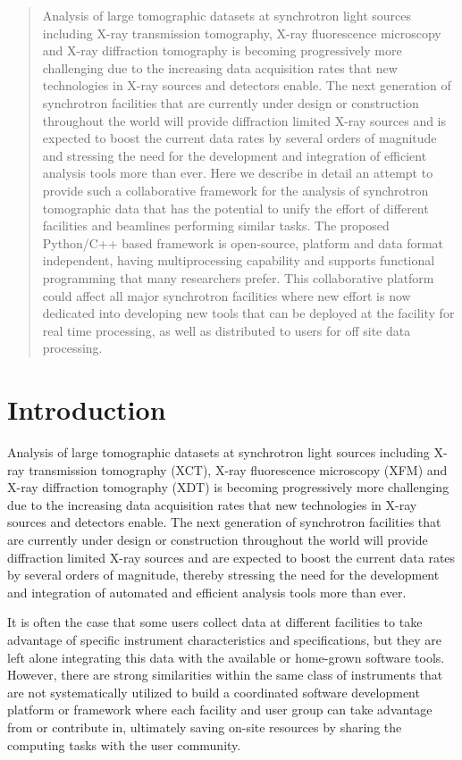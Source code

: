 \documentclass[pdf]{iucr}              %
\begin{document}
\begin{abstract}
Analysis of large tomographic datasets at synchrotron light sources including X-ray transmission tomography, X-ray fluorescence microscopy and X-ray diffraction tomography is becoming progressively more challenging due to the increasing data acquisition rates that new technologies in X-ray sources and detectors enable. The next generation of synchrotron facilities that are currently under design or construction throughout the world will provide diffraction limited X-ray sources and is expected to boost the current data rates by several orders of magnitude and stressing the need for the development and integration of efficient analysis tools more than ever. Here we describe in detail an attempt to provide such a collaborative framework for the analysis of synchrotron tomographic data that has the potential to unify the effort of different facilities and beamlines performing similar tasks. The proposed Python/C++ based framework is open-source, platform and data format independent,  having multiprocessing capability and supports functional programming that many researchers prefer. This collaborative platform could affect all major synchrotron facilities where new effort is now dedicated into developing new tools that can be deployed at the facility for real time processing, as well as distributed to users for off site data processing.
\end{abstract}


\section{Introduction}

Analysis of large tomographic datasets at synchrotron light sources including X-ray transmission tomography (XCT), X-ray fluorescence microscopy (XFM) and X-ray diffraction tomography (XDT) is becoming progressively more challenging  due to the increasing data acquisition rates that new technologies in X-ray sources and detectors enable. The next generation of synchrotron facilities that are currently under design or construction throughout the world will provide diffraction limited X-ray sources and are expected to boost the current data rates by several orders of magnitude, thereby stressing the need for the development and integration of automated and efficient analysis tools more than ever. 

It is often the case that some users collect data at different facilities to take advantage of specific instrument characteristics and specifications, but they are left alone integrating this data with the available or home-grown software tools. However, there are strong similarities within the same class of instruments that are not systematically utilized to build a coordinated software development platform or framework where each facility and user group can take advantage from or contribute in, ultimately saving on-site resources by sharing the computing tasks with the user community. 
\end{document}
